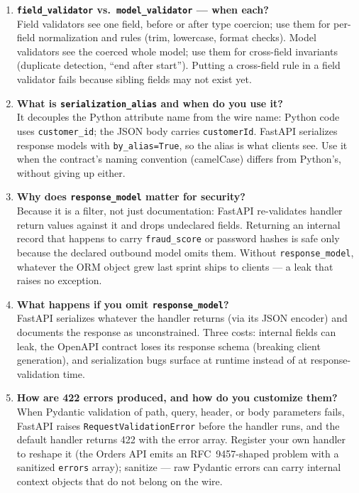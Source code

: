 \begin{enumerate}[label=\textbf{Q\arabic*.}, leftmargin=1.3cm, itemsep=0.8em]
\item \textbf{\texttt{field\_validator} vs.\ \texttt{model\_validator} ---
when each?}\\
Field validators see one field, before or after type coercion; use them for
per-field normalization and rules (trim, lowercase, format checks). Model
validators see the coerced whole model; use them for cross-field invariants
(duplicate detection, ``end after start''). Putting a cross-field rule in a
field validator fails because sibling fields may not exist yet.

\item \textbf{What is \texttt{serialization\_alias} and when do you use
it?}\\
It decouples the Python attribute name from the wire name: Python code uses
\texttt{customer\_id}; the JSON body carries \texttt{customerId}. FastAPI
serializes response models with \texttt{by\_alias=True}, so the alias is
what clients see. Use it when the contract's naming convention (camelCase)
differs from Python's, without giving up either.

\item \textbf{Why does \texttt{response\_model} matter for security?}\\
Because it is a filter, not just documentation: FastAPI re-validates handler
return values against it and drops undeclared fields. Returning an internal
record that happens to carry \texttt{fraud\_score} or password hashes is
safe only because the declared outbound model omits them. Without
\texttt{response\_model}, whatever the ORM object grew last sprint ships to
clients --- a leak that raises no exception.

\item \textbf{What happens if you omit \texttt{response\_model}?}\\
FastAPI serializes whatever the handler returns (via its JSON encoder) and
documents the response as unconstrained. Three costs: internal fields can
leak, the OpenAPI contract loses its response schema (breaking client
generation), and serialization bugs surface at runtime instead of at
response-validation time.

\item \textbf{How are 422 errors produced, and how do you customize
them?}\\
When Pydantic validation of path, query, header, or body parameters fails,
FastAPI raises \texttt{RequestValidationError} before the handler runs, and
the default handler returns 422 with the error array. Register your own
handler to reshape it (the Orders API emits an RFC~9457-shaped problem with
a sanitized \texttt{errors} array); sanitize --- raw Pydantic errors can
carry internal context objects that do not belong on the wire.


\end{enumerate}
